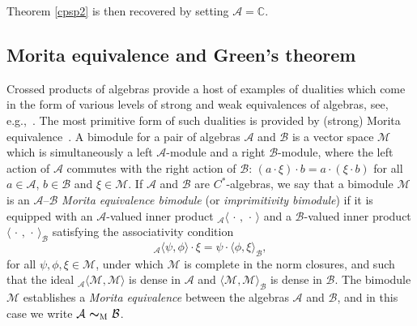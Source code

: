 \documentclass[11pt]{article}
\numberwithin{equation}{section}
\numberwithin{equation}{section}
\newcommand{\mbf}[1]{{\boldsymbol {#1} }}
\newcommand{\complex}{{\mathbb C}} %
\def\alg{{\mathcal A}}
\def\balg{{\mathcal B}}
\def\Mcal{{\mathcal M}}
\begin{document}
Theorem \ref{cpsp2} is then recovered by setting $\alg=\complex$.

\setcounter{Theorem}{9}\setcounter{subsection}{3}\setcounter{equation}{8}
\subsection{Morita equivalence and Green's theorem}\label{sec:Morita}

Crossed products of algebras provide a host of examples of dualities
which come in the form of various levels of strong and weak
equivalences of algebras, see, e.g.,~\cite{Brodzki2006}. The most
primitive form of such dualities is provided by (strong) Morita
equivalence~\cite{Rieffel1974}. A bimodule for a pair of algebras $\alg$ and $\balg$ is a
vector space $\Mcal$ which is simultaneously
 a left $\alg$-module and a right $\balg$-module, where the left action
 of $\alg$ commutes with the right action of $\balg$: $(a\cdot\xi)\cdot
 b=a\cdot (\xi\cdot b)$ for all $a\in \alg$, $b\in
 \balg$ and $\xi\in \Mcal$. If $\alg$ and $\balg$ are $C^*$-algebras,
 we say that a bimodule $\Mcal$ is an $\alg$--$\balg$ \emph{Morita
 equivalence bimodule} (or \emph{imprimitivity bimodule}) if it
is equipped with an $\alg$-valued inner product
${}_\alg\langle\,\cdot\,,\,\cdot\,\rangle$ and a $\balg$-valued inner
product $\langle\,\cdot\,,\,\cdot\,\rangle_\balg$ satisfying the
associativity condition
\[
{}_\alg\langle \psi,\phi\rangle \cdot \xi =
\psi\cdot\langle\phi,\xi\rangle_\balg ,
\]
for all $\psi,\phi,\xi\in\Mcal$, under which $\Mcal$ is complete in
the norm closures, and such that the ideal ${}_\alg\langle
\Mcal,\Mcal\rangle$ is dense in $\alg$ and $\langle
\Mcal,\Mcal\rangle_\balg$ is dense in $\balg$. The bimodule $\Mcal$ establishes a
\emph{Morita equivalence} between the algebras $\alg$ and $\balg$, and
in this case we write $\alg\ \mbf\sim_{\text{\tiny M}}\ \balg$.
\end{document}
